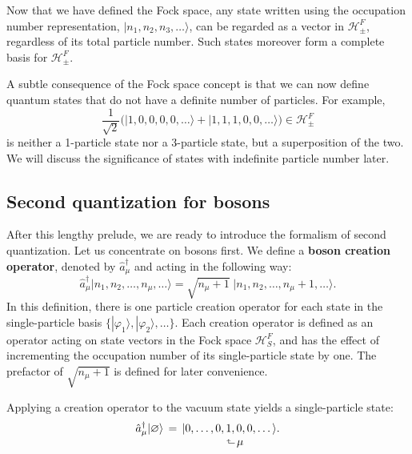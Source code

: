\documentclass[prx,12pt]{revtex4-2}
\begin{document}
Now that we have defined the Fock space, any state written using the
occupation number representation, $|n_1,n_2,n_3,\dots\rangle$, can be
regarded as a vector in $\mathscr{H}_\pm^F$, regardless of its total
particle number.  Such states moreover form a complete basis for
$\mathscr{H}^{F}_\pm$.


A subtle consequence of the Fock space concept is that we can now
define quantum states that do not have a definite number of particles.
For example,
\begin{equation*}
  \frac{1}{\sqrt{2}} \Big(|1,0,0,0,0,\dots\rangle + |1,1,1,0,0,\dots\rangle\Big)
  \in \mathscr{H}^F_\pm
\end{equation*}
is neither a 1-particle state nor a 3-particle state, but a
superposition of the two.  We will discuss the significance of states
with indefinite particle number later.

\subsection{Second quantization for bosons}
\label{sec:second_quantized_bosons}

After this lengthy prelude, we are ready to introduce the formalism of
second quantization.  Let us concentrate on bosons first.  We define a
\textbf{boson creation operator}, denoted by $\hat{a}_\mu^\dagger$ and
acting in the following way:
\begin{equation}
  \hat{a}_\mu^\dagger \big|n_1, n_2, \dots, n_\mu, \dots\big\rangle = \sqrt{n_\mu+1} \; \big|n_1, n_2, \dots, n_\mu + 1, \dots\big\rangle.
  \label{amu}
\end{equation}
In this definition, there is one particle creation operator for each
state in the single-particle basis
$\{|\varphi_1\rangle,|\varphi_2\rangle,\dots\}$.  Each creation operator is
defined as an operator acting on state vectors in the Fock space
$\mathscr{H}^F_S$, and has the effect of incrementing the occupation
number of its single-particle state by one.  The prefactor of
$\sqrt{n_\mu+1}$ is defined for later convenience.

Applying a creation operator to the vacuum state yields a
single-particle state:
\begin{align}
  \begin{aligned}\hat{a}_\mu^\dagger |\varnothing\rangle \, &= \, |0,\dots,0, 1, 0, 0, \dots\rangle. \\[-1ex] &\qquad\qquad\quad\;\;\rotatebox[origin=c]{90}{$\Rsh$}\,\mu
  \end{aligned}
\end{align}
\end{document}
